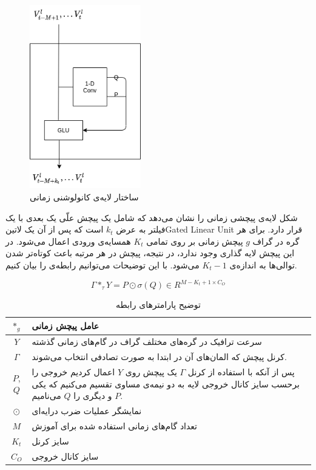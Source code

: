\documentclass{article}
\begin{document}
\begin{figure}
  \includegraphics[height=8cm]{./images/time-conv.png}
  \centering
  \caption{
ساختار لایه‌ی کانولوشنی زمانی 
  }
  \label{fig:time-conv}
\end{figure}

شکل  لایه‌ی پیچشی زمانی را نشان می‌دهد که شامل یک پیچش علّی یک بعدی
با یک فیلتر به عرض  $k_{t}$ است که پس از آن یک ‌لاتین{Gated Linear Unit} قرار دارد.
برای هر گره در گراف $g$ پیچش زمانی بر روی تمامی $K_{t}$ همسایه‌ی ورودی اعمال می‌شود.
در این پیچش لایه گذاری وجود ندارد‌‌، در نتیجه، پیچش در هر مرتبه باعث کوتاه‌تر شدن توالی‌ها به اندازه‌ی $K_{t}-1$ می‌شود.
با این توضیحات می‌توانیم رابطه‌ی  را بیان کنیم.

\begin{equation}
  \Gamma *_{\tau} Y = P \odot \sigma (Q) \in R^{M-K_{t}+1 \times C_{O}}
  \label{eq:time-conv}
\end{equation}

\begin{table}[h]
  \centering
  \caption{توضیح پارامترهای رابطه }
  \begin{tabular}{|c|p{}|}
    \hline
    $*_{g}$ & عامل پیچش زمانی \\
    \hline
    $Y$ & سرعت ترافیک در گره‌های مختلف گراف در گام‌های زمانی گذشته \\
    \hline
    $\Gamma$ & کرنل پیچش که المان‌های آن در ابتدا به صورت تصادفی انتخاب می‌شوند. \\
    \hline
    $P$, $Q$ & پس از آنکه با استفاده از کرنل $\Gamma$ یک پیچش روی $Y$ اعمال کردیم خروجی را برحسب سایز کانال خروجی لایه به دو نیمه‌ی مساوی تقسیم می‌کنیم که یکی $P$ و دیگری را $Q$ می‌نامیم. \\
    \hline
    $\odot$ & نمایشگر عملیات ضرب درایه‌ای \\
    \hline
    $M$ & تعداد گام‌های زمانی استفاده شده برای آموزش \\
    \hline
    $K_{t}$ & سایز کرنل \\
    \hline
    $C_{O}$ & سایز کانال خروجی \\
    \hline
  \end{tabular}
  \label{tbl:distance}
\end{table}
\end{document}
